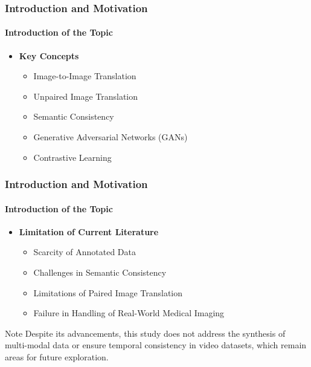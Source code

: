 \documentclass[aspectratio=169, lecture, amberg]{OTHAWbeamer}
\begin{document}
  \begin{frame}[t]
    \frametitle{Introduction and Motivation}
    \framesubtitle{Introduction of the Topic}
    
    \vspace{0.2cm} %
    \begin{itemize}
        \item \textbf{Key Concepts}
         \vspace{0.4cm}
        \begin{itemize}
            \item Image-to-Image Translation
            \vspace{0.4cm}
            \item Unpaired Image Translation
            \vspace{0.4cm}
            \item Semantic Consistency
            \vspace{0.4cm}
            \item Generative Adversarial Networks (GANs)
            \vspace{0.4cm}
            \item Contrastive Learning
        \end{itemize}
    \end{itemize}
    
\end{frame}

\begin{frame}[t]
    \frametitle{Introduction and Motivation}
    \framesubtitle{Introduction of the Topic}
    
    \vspace{0.2cm} %
    \begin{itemize}
        \item \textbf{Limitation of Current Literature}
        \vspace{0.4cm}
        \begin{itemize}
            \item Scarcity of Annotated Data
            \vspace{0.4cm}
            \item Challenges in Semantic Consistency
            \vspace{0.4cm}
            \item Limitations of Paired Image Translation
            \vspace{0.4cm}
            \item Failure in Handling of Real-World Medical Imaging
        \end{itemize}
    \end{itemize}

    \begin{block}{Note}
        Despite its advancements, this study does not address the synthesis of multi-modal data or ensure temporal consistency in video datasets, which remain areas for future exploration.
        \end{block}
    
\end{frame}
\end{document}
